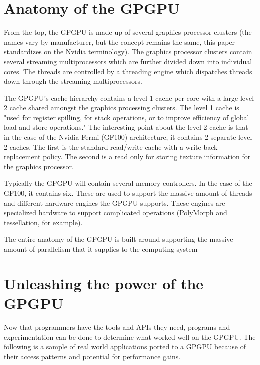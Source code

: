 \section*{Anatomy of the GPGPU}

From the top, the GPGPU is made up of several graphics processor clusters (the names vary by manufacturer, but the concept remains the same, this paper standardizes on the Nvidia terminology). The graphics processor clusters contain several streaming multiprocessors which are further divided down into individual cores. The threads are controlled by a threading engine which dispatches threads down through the streaming multiprocessors. \cite{gpuarch}

The GPGPU's cache hierarchy contains a level 1 cache per core with a large level 2 cache shared amongst the graphics processing clusters. The level 1 cache is "used for register spilling, for stack operations, or to improve efficiency of global load and store operations." \cite{gpuarch} The interesting point about the level 2 cache is that in the case of the Nvidia Fermi (GF100) architecture, it contains 2 separate level 2 caches. The first is the standard read/write cache with a write-back replacement policy. The second is a read only for storing texture information for the graphics processor. \cite{gpuarch} 

Typically the GPGPU will contain several memory controllers. In the case of the GF100, it contains six. These are used to support the massive amount of threads and different hardware engines the GPGPU supports. These engines are specialized hardware to support complicated operations (PolyMorph and tessellation, for example). 

The entire anatomy of the GPGPU is built around supporting the massive amount of parallelism that it supplies to the computing system

\section*{Unleashing the power of the GPGPU}


Now that programmers have the tools and APIs they need, programs and experimentation can be done to determine what worked well on the GPGPU. The following is a sample of real world applications ported to a GPGPU because of their access patterns and potential for performance gains. 

